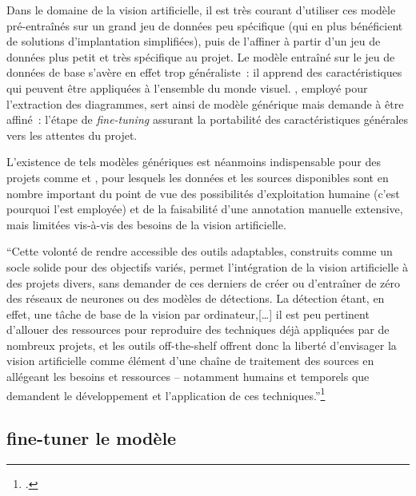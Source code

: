Dans le domaine de la vision artificielle, il est très courant
d'utiliser ces modèle pré-entraînés sur un grand jeu de données peu
spécifique (qui en plus bénéficient de solutions d'implantation
simplifiées), puis de l'affiner à partir d'un jeu de données plus petit
et très spécifique au projet. Le modèle entraîné sur le jeu de données
de base s'avère en effet trop généraliste~: il apprend des
caractéristiques qui peuvent être appliquées à l'ensemble du monde
visuel. \yolov, employé pour l'extraction des diagrammes, sert ainsi de
modèle générique mais demande à être affiné~: l'étape de \textit{fine-tuning} assurant la portabilité des caractéristiques générales vers les
attentes du projet.

L'existence de tels modèles génériques est néanmoins indispensable pour
des projets comme \eida et \vhs, pour lesquels les données et les sources
disponibles sont en nombre important du point de vue des possibilités
d'exploitation humaine (c'est pourquoi l'\ia est employée) et de la
faisabilité d'une annotation manuelle extensive, mais limitées vis-à-vis
des besoins de la vision artificielle.

\begin{kwote}                                       
``Cette volonté de rendre accessible des outils adaptables, construits
comme un socle solide pour des objectifs variés, permet l'intégration de
la vision artificielle à des projets divers, sans demander de ces
derniers de créer ou d'entraîner de zéro des réseaux de neurones ou des
modèles de détections. La détection étant, en effet, une tâche de base
de la vision par ordinateur,{[}\ldots{]} il est peu pertinent d'allouer
des ressources pour reproduire des techniques déjà appliquées par de
nombreux projets, et les outils off-the-shelf offrent donc la liberté
d'envisager la vision artificielle comme élément d'une chaîne de
traitement des sources en allégeant les besoins et ressources --
notamment humains et temporels que demandent le développement et
l'application de ces techniques.''\footcite[p.49]{norindr_traitement_2023}
                      \end{kwote}       

\hypertarget{fine-tuner-le-modele}{%
\subsection{fine-tuner le modèle}\label{fine-tuner-le-modele}}


